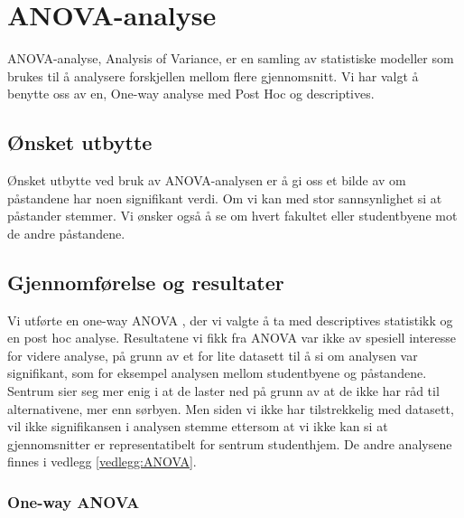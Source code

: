 \section{ANOVA-analyse}
ANOVA-analyse, Analysis of Variance, er en samling av statistiske modeller som brukes til å analysere forskjellen mellom flere gjennomsnitt. Vi har valgt å benytte oss av en, One-way analyse med Post Hoc og descriptives. 



\subsection{Ønsket utbytte}
Ønsket utbytte ved bruk av ANOVA-analysen er å gi oss et bilde av om påstandene har noen signifikant verdi. Om vi kan med stor sannsynlighet si at påstander stemmer. Vi ønsker også å se om hvert fakultet eller studentbyene mot de andre påstandene.


\subsection{Gjennomførelse og resultater}
Vi utførte en one-way ANOVA \cite{SPSSbok}, der vi valgte å ta med descriptives statistikk og en post hoc analyse. Resultatene vi fikk fra ANOVA var ikke av spesiell interesse for videre analyse, på grunn av et for lite datasett til å si om analysen var signifikant, som for eksempel analysen mellom studentbyene og påstandene. Sentrum sier seg mer enig i at de laster ned på grunn av at de ikke har råd til alternativene, mer enn sørbyen. Men siden vi ikke har tilstrekkelig med datasett, vil ikke signifikansen i analysen stemme ettersom at vi ikke kan si at gjennomsnitter er representatibelt for sentrum studenthjem. De andre analysene finnes i vedlegg \ref{vedlegg:ANOVA}.


\subsubsection{One-way ANOVA}

